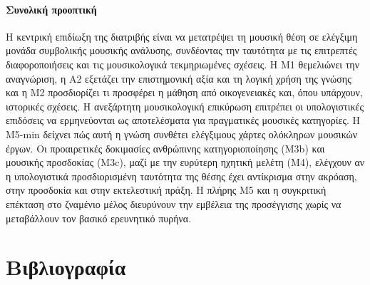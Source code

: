 \documentclass[a4paper]{article}
\begin{document}
\paragraph{Συνολική προοπτική}
Η κεντρική επιδίωξη της διατριβής είναι να μετατρέψει τη μουσική θέση σε ελέγξιμη μονάδα συμβολικής μουσικής ανάλυσης, συνδέοντας την ταυτότητα με τις επιτρεπτές διαφοροποιήσεις και τις μουσικολογικά τεκμηριωμένες σχέσεις. Η Μ1 θεμελιώνει την αναγνώριση, η Α2 εξετάζει την επιστημονική αξία και τη λογική χρήση της γνώσης και η Μ2 προσδιορίζει τι προσφέρει η μάθηση από οικογενειακές και, όπου υπάρχουν, ιστορικές σχέσεις. Η ανεξάρτητη μουσικολογική επικύρωση επιτρέπει οι υπολογιστικές επιδόσεις να ερμηνεύονται ως αποτελέσματα για πραγματικές μουσικές κατηγορίες. Η Μ5-min δείχνει πώς αυτή η γνώση συνθέτει ελέγξιμους χάρτες ολόκληρων μουσικών έργων. Οι προαιρετικές δοκιμασίες ανθρώπινης κατηγοριοποίησης (Μ3b) και μουσικής προσδοκίας (Μ3c), μαζί με την ευρύτερη ηχητική μελέτη (Μ4), ελέγχουν αν η υπολογιστικά προσδιορισμένη ταυτότητα της θέσης έχει αντίκρισμα στην ακρόαση, στην προσδοκία και στην εκτελεστική πράξη. Η πλήρης Μ5 και η συγκριτική επέκταση στο ζναμένιο μέλος διευρύνουν την εμβέλεια της προσέγγισης χωρίς να μεταβάλλουν τον βασικό ερευνητικό πυρήνα.

\section*{Βιβλιογραφία}
\end{document}
